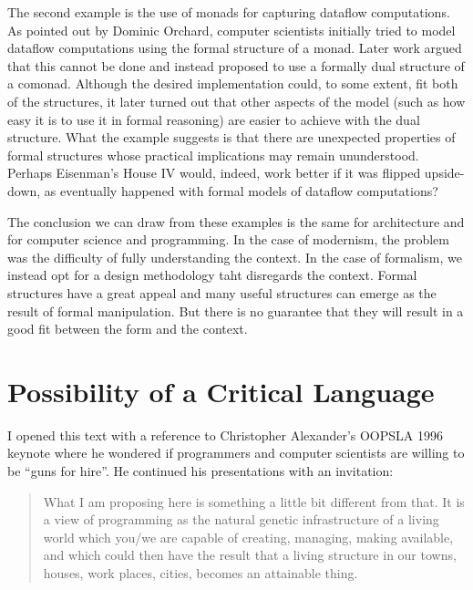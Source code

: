 The second example is the use of monads for capturing dataflow computations. As pointed out
by Dominic Orchard, computer scientists initially tried to model dataflow
computations using the formal structure of a monad. Later work argued that this cannot be done
and instead proposed to use a formally dual structure of a comonad. Although the desired
implementation could, to some extent, fit both of the structures, it later turned out that
other aspects of the model (such as how easy it is to use it in formal reasoning) are
easier to achieve with the dual structure. What the example suggests is that there are
unexpected properties of formal structures whose practical implications may remain
ununderstood. Perhaps Eisenman's House IV would, indeed, work better if it was flipped upside-down,
as eventually happened with formal models of dataflow computations?

The conclusion we can draw from these examples is the same for architecture and
for computer science and programming. In the case of modernism, the problem was the difficulty
of fully understanding the context. In the case of formalism, we instead opt for a design
methodology taht disregards the context. Formal structures have a great appeal and
many useful structures can emerge as the result of formal manipulation. But there is no
guarantee that they will result in a good fit between the form and the context.


\section{Possibility of a Critical Language}

I opened this text with a reference to Christopher Alexander's OOPSLA 1996 keynote where he
wondered if programmers and computer scientists are willing to be ``guns for hire''.
He continued his presentations with an invitation:

\begin{quote}
What I am proposing here is something a little bit different from that. It is a view of
programming as the natural genetic infrastructure of a living world which you/we are
capable of creating, managing, making available, and which could then have the result that a
living structure in our towns, houses, work places, cities, becomes an attainable thing.
\end{quote}


